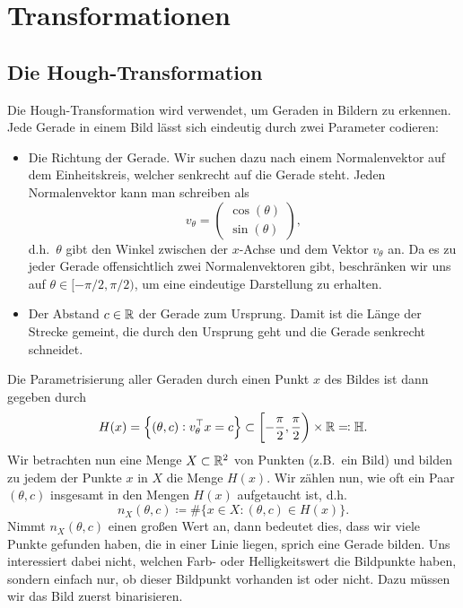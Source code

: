 \chapter{Transformationen}

\section{Die Hough-Transformation}

Die Hough-Transformation wird verwendet, um Geraden in Bildern zu erkennen. Jede Gerade in einem 
Bild lässt sich eindeutig durch zwei Parameter codieren:
\begin{itemize}
\item Die Richtung der Gerade. Wir suchen dazu nach einem Normalenvektor auf dem Einheitskreis, 
  welcher senkrecht auf die Gerade steht. Jeden Normalenvektor kann man schreiben als
  \[
    v_{\theta} = \begin{pmatrix} \cos(\theta) \\ \sin(\theta) \end{pmatrix},
  \]
  d.h.\ $ \theta $ gibt den Winkel zwischen der $ x $-Achse und dem Vektor $ v_{\theta} $ an. Da es
  zu jeder Gerade offensichtlich zwei Normalenvektoren gibt, beschränken wir uns auf
  $ \theta \in [-\pi / 2, \pi / 2) $, um eine eindeutige Darstellung zu erhalten.
\item Der Abstand $ c \in \mathbb{R} $ der Gerade zum Ursprung. Damit ist die Länge der Strecke gemeint, 
  die durch den Ursprung geht und die Gerade senkrecht schneidet.
\end{itemize}
Die Parametrisierung aller Geraden durch einen Punkt $ x $ des Bildes ist dann gegeben durch
\[
  H(x) = \left\{ 
    (\theta, c) : v_{\theta}^{\top} x = c
  \right\} \subset \left[ -\frac{\pi}{2}, \frac{\pi}{2} \right) \times \mathbb{R} \eqqcolon \mathbb{H}.
\]
Wir betrachten nun eine Menge $ X \subset \mathbb{R}^{2} $ von Punkten (z.B.\ ein Bild) und bilden zu jedem 
der Punkte $ x $ in $ X $ die Menge $ H(x) $. Wir zählen nun, wie oft ein Paar $ (\theta, c) $
insgesamt in den Mengen $ H(x) $ aufgetaucht ist, d.h.\
\[
  n_{X}(\theta, c) \coloneqq \#\{ x \in X : (\theta, c) \in H(x) \}.
\]
Nimmt $ n_{X}(\theta, c) $ einen großen Wert an, dann bedeutet dies, dass wir viele Punkte gefunden
haben, die in einer Linie liegen, sprich eine Gerade bilden. Uns interessiert dabei nicht, welchen
Farb- oder Helligkeitswert die Bildpunkte haben, sondern einfach nur, ob dieser Bildpunkt vorhanden
ist oder nicht. Dazu müssen wir das Bild zuerst binarisieren.


